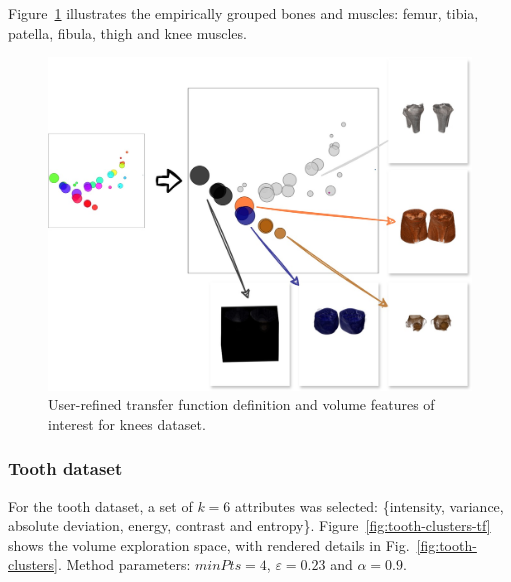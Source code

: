 Figure~\ref{fig:knees-groups} illustrates the empirically grouped bones and muscles: femur, tibia, patella, fibula, thigh and knee muscles.

\begin{figure}[htb!]
    \centering
    \includegraphics[width=\columnwidth]{figs/knees-groups.jpg}
    \caption{User-refined transfer function definition and volume features of interest for knees dataset.}
    \label{fig:knees-groups}
\end{figure}

\subsubsection{Tooth dataset}
\label{subsubsect:tooth-dataset}

For the tooth dataset, a set of \(k = 6\) attributes was selected: \{intensity, variance, absolute deviation, energy, contrast and entropy\}. Figure~\ref{fig:tooth-clusters-tf} shows the volume exploration space, with rendered details in Fig.~\ref{fig:tooth-clusters}. Method parameters: $minPts=4$, $\varepsilon=0.23$ and $\alpha=0.9$.

